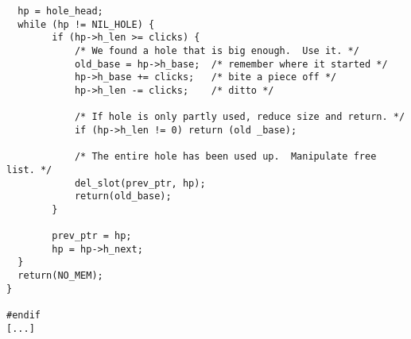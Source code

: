 \begin{verbatim}
  hp = hole_head;
  while (hp != NIL_HOLE) {
        if (hp->h_len >= clicks) {
            /* We found a hole that is big enough.  Use it. */
            old_base = hp->h_base;  /* remember where it started */
            hp->h_base += clicks;   /* bite a piece off */
            hp->h_len -= clicks;    /* ditto */

            /* If hole is only partly used, reduce size and return. */
            if (hp->h_len != 0) return (old _base);

            /* The entire hole has been used up.  Manipulate free list. */
            del_slot(prev_ptr, hp);
            return(old_base);
        }
        
        prev_ptr = hp;
        hp = hp->h_next;
  }
  return(NO_MEM);
}

#endif
[...]
\end{verbatim}
